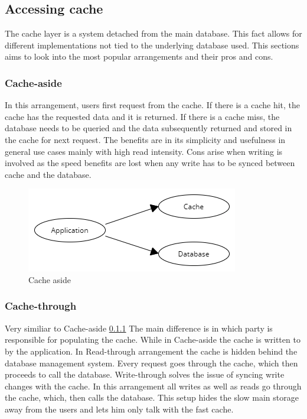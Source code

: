\documentclass[10pt,a4paper]{article}
\begin{document}
\subsection{Accessing cache}
The cache layer is a system detached from the main database. This fact allows for different implementations not tied to the underlying database used. This sections aims to look into the most popular arrangements and their pros and cons.\cite{AWS}\cite{Prisma} %

\subsubsection{Cache-aside}
\label{sec:cache-aside}
In this arrangement, users first request from the cache. If there is a cache hit, the cache has the requested data and it is returned. If there is a cache miss, the database needs to be queried and the data subsequently returned and stored in the cache for next request. The benefits are in its simplicity and usefulness in general use cases mainly with high read intensity. 
Cons arise when writing is involved as the speed benefits are lost when any write has to be synced between cache and the database.

\begin{figure}[h]
    \centering
    \includegraphics[width=0.5\linewidth]{Cache-aside.png}
    \caption{Cache aside}
    \label{fig:cache-aside}
\end{figure}

\subsubsection{Cache-through}
Very similiar to Cache-aside \ref{sec:cache-aside} The main difference is in which party is responsible for populating the cache. While in Cache-aside the cache is written to by the application. In Read-through arrangement the cache is hidden behind the database management system. Every request goes through the cache, which then proceeds to call the database. Write-through solves the issue of syncing write changes with the cache. In this arrangement all writes as well as reads go through the cache, which, then calls the database. This setup hides the slow main storage away from the users and lets him only talk with the fast cache.
\end{document}
